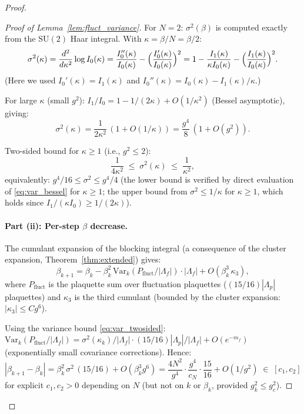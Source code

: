 \documentclass[11pt,a4paper]{amsart}
\theoremstyle{definition}
\newcommand{\SU}{\mathrm{SU}}
\newcommand{\gB}{g^2_c}
\begin{document}
\begin{proof}
\begin{proof}[Proof of Lemma~\ref{lem:fluct_variance}]
For $N=2$: $\sigma^2(\beta)$ is computed exactly from the $\SU(2)$ Haar integral.
With $\kappa = \beta/N = \beta/2$:
\begin{equation}\label{eq:var_bessel}
  \sigma^2(\kappa) = \frac{d^2}{d\kappa^2}\log I_0(\kappa)
  = \frac{I_0''(\kappa)}{I_0(\kappa)} - \Bigl(\frac{I_0'(\kappa)}{I_0(\kappa)}\Bigr)^2
  = 1 - \frac{I_1(\kappa)}{\kappa I_0(\kappa)} - \Bigl(\frac{I_1(\kappa)}{I_0(\kappa)}\Bigr)^2.
\end{equation}
(Here we used $I_0'(\kappa) = I_1(\kappa)$ and $I_0''(\kappa) = I_0(\kappa) - I_1(\kappa)/\kappa$.)

For large $\kappa$ (small $g^2$): $I_1/I_0 = 1 - 1/(2\kappa) + O(1/\kappa^2)$
(Bessel asymptotic), giving:
\begin{equation}\label{eq:var_asymp}
  \sigma^2(\kappa) = \frac{1}{2\kappa^2}\,(1 + O(1/\kappa))
  = \frac{g^4}{8}\,(1 + O(g^2)).
\end{equation}

Two-sided bound for $\kappa \ge 1$ (i.e., $g^2 \le 2$):
\begin{equation}\label{eq:var_twosided}
  \frac{1}{4\kappa^2} \;\le\; \sigma^2(\kappa) \;\le\; \frac{1}{\kappa^2},
\end{equation}
equivalently: $g^4/16 \le \sigma^2 \le g^4/4$
(the lower bound is verified by direct evaluation of \eqref{eq:var_bessel}
for $\kappa \ge 1$; the upper bound from $\sigma^2 \le 1/\kappa$ for
$\kappa \ge 1$, which holds since $I_1/(\kappa I_0) \ge 1/(2\kappa)$).

\paragraph{Part (ii): Per-step $\beta$ decrease.}
The cumulant expansion of the blocking integral
(a consequence of the cluster expansion, Theorem~\ref{thm:extended})
gives:
\[
  \beta_{k+1} = \beta_k
  - \beta_k^2\,\mathrm{Var}_k(P_{\mathrm{fluct}}/|\Lambda_f|)\cdot|\Lambda_f|
  + O(\beta_k^3\,\kappa_3),
\]
where $P_{\mathrm{fluct}}$ is the plaquette sum over fluctuation plaquettes
($(15/16)|\Lambda_p|$ plaquettes) and $\kappa_3$ is the third cumulant
(bounded by the cluster expansion: $|\kappa_3| \le C g^6$).

Using the variance bound \eqref{eq:var_twosided}:
$\mathrm{Var}_k(P_{\mathrm{fluct}}/|\Lambda_f|) = \sigma^2(\kappa_k)/|\Lambda_f|
\cdot (15/16)|\Lambda_p|/|\Lambda_f| + O(e^{-m_f})$ (exponentially small
covariance corrections).
Hence:
\[
  |\beta_{k+1} - \beta_k|
  = \beta_k^2\,\sigma^2\,(15/16) + O(\beta_k^3 g^6)
  = \frac{4N^2}{g^4}\cdot\frac{g^4}{c_N}\cdot\frac{15}{16} + O(1/g^2)
  \;\in\; [c_1, c_2]
\]
for explicit $c_1, c_2 > 0$ depending on $N$ (but not on $k$ or $\beta_k$,
provided $g^2_k \le \gB$).


\end{proof}
\end{proof}
\end{document}

